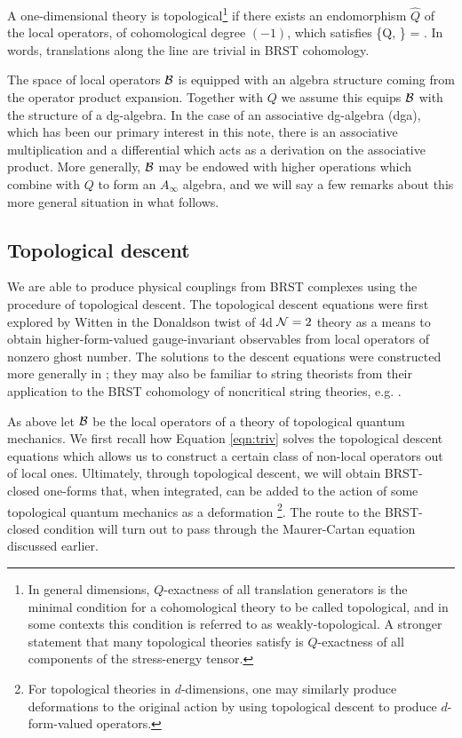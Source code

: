\documentclass[11pt]{amsart}
\begin{document}
A one-dimensional theory is topological\footnote{In general dimensions, $Q$-exactness of all translation generators is the minimal condition for a cohomological theory to be called topological, and in some contexts this condition is referred to as weakly-topological. A stronger statement that many topological theories satisfy is $Q$-exactness of all components of the stress-energy tensor.} if there exists an endomorphism $\hat{Q}$ of the local operators, of cohomological degree $(-1)$, which satisfies
\beqn\label{eqn:triv}
\{Q, \} =  .
\eeqn
In words, translations along the line are trivial in BRST cohomology. 

The space of local operators $\mathcal B$ is equipped with an algebra structure coming from the operator product expansion. 
Together with $Q$ we assume this equips $\mathcal B$ with the structure of a  dg-algebra. In the case of an associative dg-algebra (dga), which has been our primary interest in this note, there is an associative multiplication and a differential which acts as a derivation on the associative product. 
More generally, $\mathcal B$ may be endowed with higher operations which combine with $Q$ to form an $A_\infty$ algebra, and we will say a few remarks about this more general situation in what follows. 

\subsection{Topological descent}\label{sec:descent}
We are able to produce physical couplings from BRST complexes using the procedure of topological descent. The topological descent equations were first explored by Witten in the Donaldson twist of 4d $\mathcal N=2$ theory \cite{W88} as a means to obtain higher-form-valued gauge-invariant observables from local operators of nonzero ghost number. The solutions to the descent equations were constructed more generally in \cite{MW97}; they may also be familiar to string theorists from their application to the BRST cohomology of noncritical string theories, e.g. \cite{WZ92}.

As above let $\mathcal B$ be the local operators of a theory of topological quantum mechanics. 
We first recall how Equation \eqref{eqn:triv} solves the topological descent equations which allows us to construct a certain class of non-local operators out of local ones. Ultimately, through topological descent, we will obtain BRST-closed one-forms that, when integrated, can be added to the action of some topological quantum mechanics as a deformation \footnote{For topological theories in $d$-dimensions, one may similarly produce deformations to the original action by using topological descent to produce $d$-form-valued operators.}. The route to the BRST-closed condition will turn out to pass through the Maurer-Cartan equation discussed earlier. 
\end{document}
